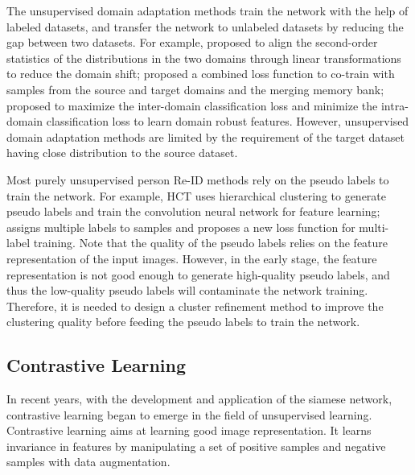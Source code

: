 \documentclass[journal]{IEEEtran}
\begin{document}
The unsupervised domain adaptation methods train the network with the help of labeled datasets, and transfer the network to unlabeled datasets by reducing 
the gap between two datasets. For example, \cite{sun:AAAI16} proposed to align the second-order statistics of the distributions in the two domains through linear transformations to reduce the domain shift; \cite{Ge:NIPS20} proposed a combined loss function to co-train with samples from the source and target domains and the merging memory bank; \cite{ganin:arxiv14} proposed to maximize the inter-domain classification loss and minimize the intra-domain classification loss to learn domain robust features. 
However, unsupervised domain adaptation methods are limited by the requirement of the target dataset having close distribution to the source dataset.



Most purely unsupervised person Re-ID methods rely on the pseudo labels to train the network. For example, HCT \cite{Zeng:CVPR20} uses hierarchical clustering to generate pseudo labels and train the convolution neural network for feature learning; \cite{Wang:CVPR20} assigns multiple labels to samples and proposes a new loss function for multi-label training. 
Note that the quality of the pseudo labels relies on the feature representation of the input images. However, in the early stage, the feature representation is not good enough to generate high-quality pseudo labels, and thus the low-quality pseudo labels will contaminate the network training. Therefore, it is needed to design a cluster refinement method to improve the clustering quality before feeding the pseudo labels to train the network. 



\subsection{Contrastive Learning}

In recent years, with the development and application of the siamese network, contrastive learning began to emerge in the field of unsupervised learning. 
Contrastive learning aims at learning good image representation. It learns invariance in features by 
manipulating a set of positive samples and negative samples with data augmentation. 
\end{document}
